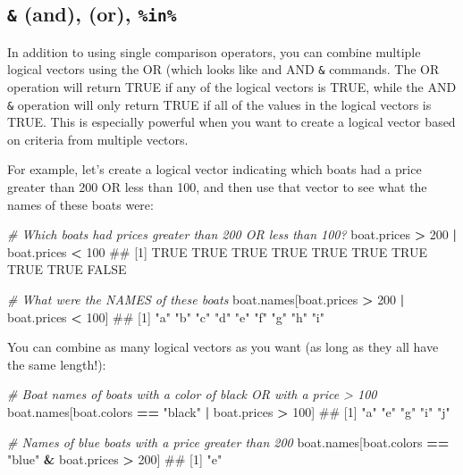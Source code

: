 \documentclass[]{book}
\newenvironment{Shaded}{\begin{snugshade}}{\end{snugshade}}
\newcommand{\DecValTok}[1]{\textcolor[rgb]{0.00,0.00,0.81}{#1}}
\newcommand{\StringTok}[1]{\textcolor[rgb]{0.31,0.60,0.02}{#1}}
\newcommand{\CommentTok}[1]{\textcolor[rgb]{0.56,0.35,0.01}{\textit{#1}}}
\newcommand{\OperatorTok}[1]{\textcolor[rgb]{0.81,0.36,0.00}{\textbf{#1}}}
\newcommand{\NormalTok}[1]{#1}
\theoremstyle{definition}
\theoremstyle{definition}
\theoremstyle{remark}
\begin{document}
\subsection{\texorpdfstring{\texttt{\&} (and), \texttt{\textbar{}} (or),
\texttt{\%in\%}}{\& (and), \textbar{} (or), \%in\%}}\label{and-or-in}

In addition to using single comparison operators, you can combine
multiple logical vectors using the OR (which looks like
\texttt{\textbar{}} and AND \texttt{\&} commands. The OR
\texttt{\textbar{}} operation will return TRUE if any of the logical
vectors is TRUE, while the AND \texttt{\&} operation will only return
TRUE if all of the values in the logical vectors is TRUE. This is
especially powerful when you want to create a logical vector based on
criteria from multiple vectors.

For example, let's create a logical vector indicating which boats had a
price greater than 200 OR less than 100, and then use that vector to see
what the names of these boats were:

\begin{Shaded}
\begin{Highlighting}[]
\CommentTok{# Which boats had prices greater than 200 OR less than 100?}
\NormalTok{boat.prices }\OperatorTok{>}\StringTok{ }\DecValTok{200} \OperatorTok{|}\StringTok{ }\NormalTok{boat.prices }\OperatorTok{<}\StringTok{ }\DecValTok{100}
\NormalTok{##  [1]  TRUE  TRUE  TRUE  TRUE  TRUE  TRUE  TRUE  TRUE  TRUE FALSE}

\CommentTok{# What were the NAMES of these boats}
\NormalTok{boat.names[boat.prices }\OperatorTok{>}\StringTok{ }\DecValTok{200} \OperatorTok{|}\StringTok{ }\NormalTok{boat.prices }\OperatorTok{<}\StringTok{ }\DecValTok{100}\NormalTok{]}
\NormalTok{## [1] "a" "b" "c" "d" "e" "f" "g" "h" "i"}
\end{Highlighting}
\end{Shaded}

You can combine as many logical vectors as you want (as long as they all
have the same length!):

\begin{Shaded}
\begin{Highlighting}[]
\CommentTok{# Boat names of boats with a color of black OR with a price > 100}
\NormalTok{boat.names[boat.colors }\OperatorTok{==}\StringTok{ "black"} \OperatorTok{|}\StringTok{ }\NormalTok{boat.prices }\OperatorTok{>}\StringTok{ }\DecValTok{100}\NormalTok{]}
\NormalTok{## [1] "a" "e" "g" "i" "j"}

\CommentTok{# Names of blue boats with a price greater than 200}
\NormalTok{boat.names[boat.colors }\OperatorTok{==}\StringTok{ "blue"} \OperatorTok{&}\StringTok{ }\NormalTok{boat.prices }\OperatorTok{>}\StringTok{ }\DecValTok{200}\NormalTok{]}
\NormalTok{## [1] "e"}
\end{Highlighting}
\end{Shaded}
\end{document}
